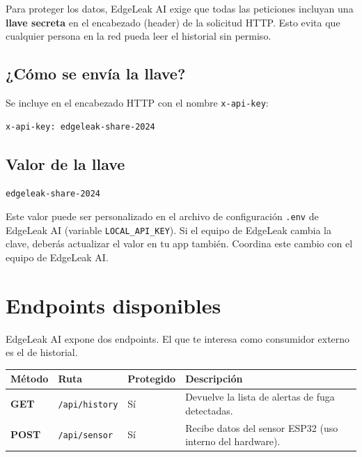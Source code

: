 \documentclass[12pt, a4paper]{article}
\begin{document}
Para proteger los datos, EdgeLeak AI exige que todas las peticiones incluyan
una \textbf{llave secreta} en el encabezado (header) de la solicitud HTTP. Esto
evita que cualquier persona en la red pueda leer el historial sin permiso.

\subsection{¿Cómo se envía la llave?}

Se incluye en el encabezado HTTP con el nombre \texttt{x-api-key}:

\begin{lstlisting}[style=httpStyle]
x-api-key: edgeleak-share-2024
\end{lstlisting}

\subsection{Valor de la llave}

\begin{center}
  \begin{tcolorbox}[
    enhanced,
    colback=codebg,
    colframe=edgegray,
    width=0.6\textwidth,
    center,
    left=10pt, right=10pt,
  ]
    \centering
    \texttt{\large edgeleak-share-2024}
  \end{tcolorbox}
\end{center}

\begin{tcolorbox}[warningbox]
  Este valor puede ser personalizado en el archivo de configuración
  \texttt{.env} de EdgeLeak AI (variable \texttt{LOCAL\_API\_KEY}). Si el
  equipo de EdgeLeak cambia la clave, deberás actualizar el valor en tu app
  también. Coordina este cambio con el equipo de EdgeLeak AI.
\end{tcolorbox}

\section{Endpoints disponibles}

EdgeLeak AI expone dos endpoints. El que te interesa como consumidor externo
es el de historial.

\begin{center}
\begin{tabular}{>{\bfseries}l l l p{5.5cm}}
  \toprule
  Método & Ruta & Protegido & Descripción \\
  \midrule
  \textcolor{successgreen}{GET}  & \texttt{/api/history} & Sí & Devuelve la lista de alertas de fuga detectadas. \\
  \addlinespace
  \textcolor{edgeorange}{POST} & \texttt{/api/sensor}  & Sí & Recibe datos del sensor ESP32 (uso interno del hardware). \\
  \bottomrule
\end{tabular}
\end{center}
\end{document}
